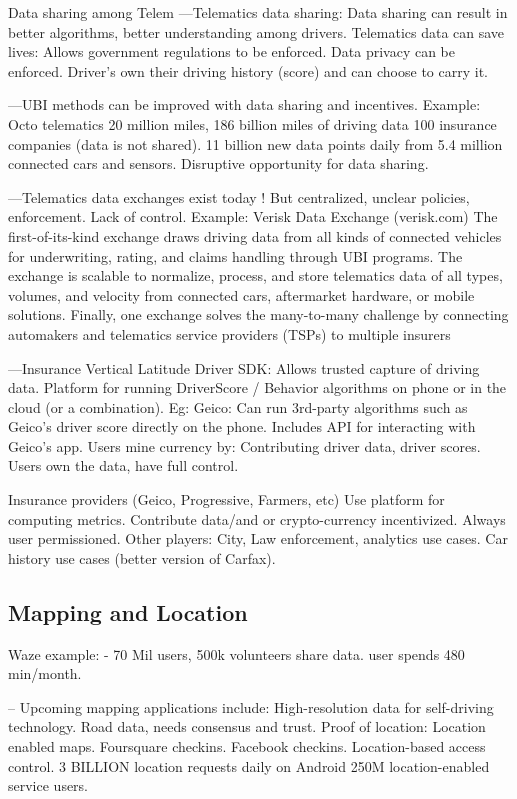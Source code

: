 Data sharing among Telem
---Telematics data sharing:
Data sharing can result in better algorithms, better understanding among drivers.
Telematics data can save lives:
Allows government regulations to be enforced. Data privacy can be enforced.
Driver’s own their driving history (score) and can choose to carry it.


---UBI methods can be improved with data sharing and incentives.
Example:
Octo telematics
20 million miles, 186 billion miles of driving data
100 insurance companies (data is not shared).
11 billion new data points daily from 5.4 million connected cars and sensors.
Disruptive opportunity for data sharing.



---Telematics data exchanges exist today !
But centralized, unclear policies, enforcement.
 Lack of control.
 Example: Verisk Data Exchange (verisk.com)
 The first-of-its-kind  exchange draws driving data from all kinds of connected vehicles for underwriting, rating, and
 claims handling through UBI programs. 
 The exchange is scalable to normalize, process, and store telematics data of all types, volumes, and velocity from
 connected cars, aftermarket hardware, or mobile solutions.
 Finally, one exchange solves the many-to-many challenge by connecting automakers and telematics service providers
 (TSPs) to multiple insurers


 ---Insurance Vertical
 Latitude Driver SDK:
 Allows trusted capture of driving data.
 Platform for running DriverScore / Behavior algorithms on phone or in the cloud (or a combination). 
 Eg: Geico:
 Can run 3rd-party algorithms such as Geico’s driver score directly on the phone.
 Includes API for interacting with Geico’s app.
 Users mine currency by:
 Contributing driver data, driver scores.
 Users own the data, have full control.

 Insurance providers (Geico, Progressive, Farmers, etc)
 Use platform for computing metrics.
 Contribute data/and or crypto-currency incentivized.
 Always user permissioned.
 Other players:
 City, Law enforcement, analytics use cases.
 Car history use cases (better version of Carfax).


\subsection{Mapping and Location}

Waze example:
 - 70 Mil users, 500k volunteers share data. user spends 480 min/month.

-- Upcoming mapping applications include:
 High-resolution data for self-driving technology.
 Road data, needs consensus and trust.
 Proof of location:
 Location enabled maps. 
 Foursquare checkins. Facebook checkins.
 Location-based access control.
 3 BILLION location requests daily on Android
 250M location-enabled service users.

